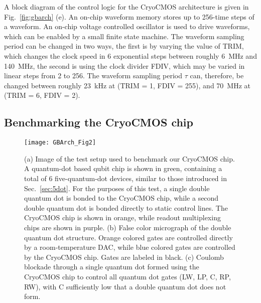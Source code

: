 A block diagram of the control logic for the CryoCMOS architecture is given in Fig.~\ref{fig:gbarch} (e). An on-chip waveform memory stores up to 256-time steps of a waveform. An on-chip voltage controlled oscillator is used to drive waveforms, which can be enabled by a small finite state machine. The waveform sampling period can be changed in two ways,
the first is by varying the value of TRIM, which changes the clock speed in 6 exponential steps between roughly \SI{6}{\mega\hertz} and \SI{140}{\mega\hertz}, the second is using
the clock divider FDIV, which may be varied in linear steps from 2 to 256. The waveform sampling period $\tau$ can, therefore, be changed between roughly \SI{23}{\kilo\hertz} at
(TRIM = 1, FDIV = 255), and \SI{70}{\mega\hertz} at (TRIM = 6, FDIV = 2).

\subsection{Benchmarking the CryoCMOS chip}

\begin{figure}
  \texttt{[image: GBArch\_Fig2]}
  \caption[Testbench for the CryoCMOS architecture]
  {\label{fig:gbtb}(a) Image of the test setup used to benchmark our CryoCMOS chip. A quantum-dot based qubit chip is shown in green, containing a total of 6 five-quantum-dot devices, similar to those introduced in Sec.~\ref{sec:5dot}. For the purposes of this test, a single double quantum dot is bonded to the CryoCMOS chip, while a second double quantum dot is bonded directly to static control lines. The CryoCMOS chip is shown in orange, while readout multiplexing chips are shown in purple. (b) False color micrograph of the double quantum dot structure. Orange colored gates are controlled directly by a room-temperature DAC, while blue colored gates are controlled by the CryoCMOS chip. Gates are labeled in black. (c) Coulomb blockade through a single quantum dot formed using the CryoCMOS chip to control all quantum dot gates (LW, LP, C, RP, RW), with C sufficiently low that a double quantum dot does not form.}
\end{figure}

